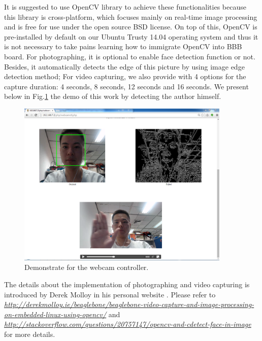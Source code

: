 \documentclass[12pt,journal,draftclsnofoot,onecolumn]{IEEEtran}
\begin{document}
It is suggested to use OpenCV library to achieve these functionalities because this library is cross-platform, which focuses mainly on real-time image processing and is free for use under the open source BSD license.
On top of this, OpenCV is pre-installed by default on our Ubuntu Trusty 14.04 operating system and thus it is not necessary to take pains learning how to immigrate OpenCV into BBB board. For photographing, it is optional to enable face detection function or not. Besides, it automatically detects the edge of this picture by using image edge detection method;  For video capturing, we also provide with 4 options for the capture duration: 4 seconds, 8 seconds, 12 seconds and 16 seconds.  We present below in Fig.\ref{webcamdemo} the demo of this work by detecting the author himself.
\begin{figure}[htb]
	\centering
	\includegraphics[width=4in]{./figs/webcam3.PNG}
	\caption{Demonstrate for the webcam controller.}
	\label{webcamdemo}
\end{figure}

The details about the implementation of photographing and video capturing is introduced by Derek Molloy in his personal website \cite{molloy}. Please refer to \textcolor{blue}{\textit{\url{http://derekmolloy.ie/beaglebone/beaglebone-video-capture-and-image-processing-on-embedded-linux-using-opencv/}}} and \textcolor{blue}{\textit{\url{http://stackoverflow.com/questions/20757147/opencv-and-cdetect-face-in-image}}} for more details.
%
%
\end{document}
